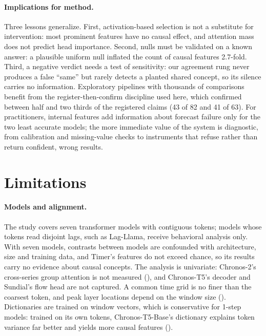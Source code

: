 \paragraph{Implications for method.} Three lessons generalize. First, activation-based selection is not a substitute for
intervention: most prominent features have no causal effect, and attention mass does not predict head importance. Second,
nulls must be validated on a known answer: a plausible uniform null inflated the count of causal features 2.7-fold.
Third, a negative verdict needs a test of sensitivity: our agreement rung never produces a false ``same'' but rarely
detects a planted shared concept, so its silence carries no information. Exploratory pipelines with thousands of
comparisons \citep{gelman2014garden} benefit from the register-then-confirm discipline used here, which confirmed between
half and two thirds of the registered claims (43 of 82 and 41 of 63). For practitioners, internal features add
information about forecast failure only for the two least accurate models; the more immediate value of the system is
diagnostic, from calibration and missing-value checks to instruments that refuse rather than return confident, wrong
results.

\section{Limitations}
\label{sec:limitations}

\paragraph{Models and alignment.} The study covers seven transformer models with contiguous tokens; models whose tokens
read disjoint lags, such as Lag-Llama, receive behavioral analysis only. With seven models, contrasts between models are
confounded with architecture, size and training data, and Timer's features do not exceed chance, so its results carry no
evidence about causal concepts. The analysis is univariate: Chronos-2's cross-series group attention is not measured
(), and Chronos-T5's decoder and Sundial's flow head are not captured. A common time grid is no finer than the
coarsest token, and peak layer locations depend on the window size (). Dictionaries are trained on window
vectors, which is conservative for 1-step models: trained on its own tokens, Chronos-T5-Base's dictionary explains token
variance far better and yields more causal features ().

